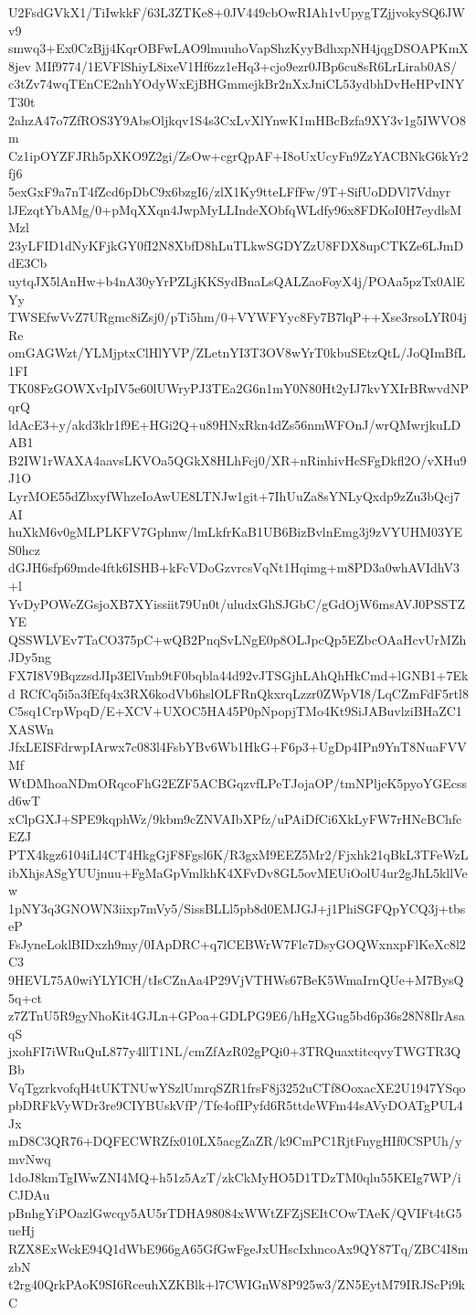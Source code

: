 U2FsdGVkX1/TiIwkkF/63L3ZTKe8+0JV449cbOwRIAh1vUpygTZjjvokySQ6JWv9
smwq3+Ex0CzBjj4KqrOBFwLAO9lmuuhoVapShzKyyBdhxpNH4jqgDSOAPKmX8jev
MIf9774/1EVFlShiyL8ixeV1Hf6zz1eHq3+cjo9ezr0JBp6cu8sR6LrLirab0AS/
c3tZv74wqTEnCE2nhYOdyWxEjBHGmmejkBr2nXxJniCL53ydbhDvHeHPvINYT30t
2ahzA47o7ZfROS3Y9AbsOljkqv1S4s3CxLvXlYnwK1mHBcBzfa9XY3v1g5IWVO8m
Cz1ipOYZFJRh5pXKO9Z2gi/ZsOw+cgrQpAF+I8oUxUcyFn9ZzYACBNkG6kYr2fj6
5exGxF9a7nT4fZcd6pDbC9x6bzgI6/zlX1Ky9tteLFfFw/9T+SifUoDDVl7Vdnyr
lJEzqtYbAMg/0+pMqXXqn4JwpMyLLIndeXObfqWLdfy96x8FDKoI0H7eydlsMMzl
23yLFID1dNyKFjkGY0fI2N8XbfD8hLuTLkwSGDYZzU8FDX8upCTKZe6LJmDdE3Cb
uytqJX5lAnHw+b4nA30yYrPZLjKKSydBnaLsQALZaoFoyX4j/POAa5pzTx0AlEYy
TWSEfwVvZ7URgmc8iZsj0/pTi5hm/0+VYWFYyc8Fy7B7lqP++Xse3rsoLYR04jRe
omGAGWzt/YLMjptxClHlYVP/ZLetnYI3T3OV8wYrT0kbuSEtzQtL/JoQImBfL1FI
TK08FzGOWXvIpIV5e60lUWryPJ3TEa2G6n1mY0N80Ht2yIJ7kvYXIrBRwvdNPqrQ
ldAcE3+y/akd3klr1f9E+HGi2Q+u89HNxRkn4dZs56nmWFOnJ/wrQMwrjkuLDAB1
B2IW1rWAXA4aavsLKVOa5QGkX8HLhFcj0/XR+nRinhivHcSFgDkfl2O/vXHu9J1O
LyrMOE55dZbxyfWhzeIoAwUE8LTNJw1git+7IhUuZa8sYNLyQxdp9zZu3bQcj7AI
huXkM6v0gMLPLKFV7Gphnw/lmLkfrKaB1UB6BizBvlnEmg3j9zVYUHM03YES0hcz
dGJH6sfp69mde4ftk6ISHB+kFcVDoGzvrcsVqNt1Hqimg+m8PD3a0whAVIdhV3+l
YvDyPOWeZGsjoXB7XYissiit79Un0t/uludxGhSJGbC/gGdOjW6msAVJ0PSSTZYE
QSSWLVEv7TaCO375pC+wQB2PnqSvLNgE0p8OLJpcQp5EZbcOAaHcvUrMZhJDy5ng
FX7I8V9BqzzsdJIp3ElVmb9tF0bqbla44d92vJTSGjhLAhQhHkCmd+lGNB1+7Ekd
RCfCq5i5a3fEfq4x3RX6kodVb6hslOLFRnQkxrqLzzr0ZWpVI8/LqCZmFdF5rtl8
C5sq1CrpWpqD/E+XCV+UXOC5HA45P0pNpopjTMo4Kt9SiJABuvlziBHaZC1XASWn
JfxLEISFdrwpIArwx7c083l4FsbYBv6Wb1HkG+F6p3+UgDp4IPn9YnT8NuaFVVMf
WtDMhoaNDmORqcoFhG2EZF5ACBGqzvfLPeTJojaOP/tmNPljeK5pyoYGEcssd6wT
xClpGXJ+SPE9kqphWz/9kbm9cZNVAIbXPfz/uPAiDfCi6XkLyFW7rHNcBChfcEZJ
PTX4kgz6104iLl4CT4HkgGjF8Fgsl6K/R3gxM9EEZ5Mr2/Fjxhk21qBkL3TFeWzL
ibXhjsASgYUUjnuu+FgMaGpVmlkhK4XFvDv8GL5ovMEUiOolU4ur2gJhL5kllVew
1pNY3q3GNOWN3iixp7mVy5/SissBLLl5pb8d0EMJGJ+j1PhiSGFQpYCQ3j+tbseP
FsJyneLoklBIDxzh9my/0IApDRC+q7lCEBWrW7Flc7DsyGOQWxnxpFlKeXc8l2C3
9HEVL75A0wiYLYICH/tIsCZnAa4P29VjVTHWs67BeK5WmaIrnQUe+M7BysQ5q+ct
z7ZTnU5R9gyNhoKit4GJLn+GPoa+GDLPG9E6/hHgXGug5bd6p36s28N8IlrAsaqS
jxohFI7iWRuQuL877y4llT1NL/cmZfAzR02gPQi0+3TRQuaxtitcqvyTWGTR3QBb
VqTgzrkvofqH4tUKTNUwYSzlUmrqSZR1frsF8j3252uCTf8OoxacXE2U1947YSqo
pbDRFkVyWDr3re9CIYBUskVfP/Tfe4ofIPyfd6R5ttdeWFm44sAVyDOATgPUL4Jx
mD8C3QR76+DQFECWRZfx010LX5acgZaZR/k9CmPC1RjtFnygHIf0CSPUh/ymvNwq
1doJ8kmTgIWwZNI4MQ+h51z5AzT/zkCkMyHO5D1TDzTM0qlu55KEIg7WP/iCJDAu
pBnhgYiPOazlGwcqy5AU5rTDHA98084xWWtZFZjSEItCOwTAeK/QVIFt4tG5ueHj
RZX8ExWckE94Q1dWbE966gA65GfGwFgeJxUHscIxhncoAx9QY87Tq/ZBC4I8mzbN
t2rg40QrkPAoK9SI6RceuhXZKBlk+l7CWIGnW8P925w3/ZN5EytM79IRJScPi9kC

